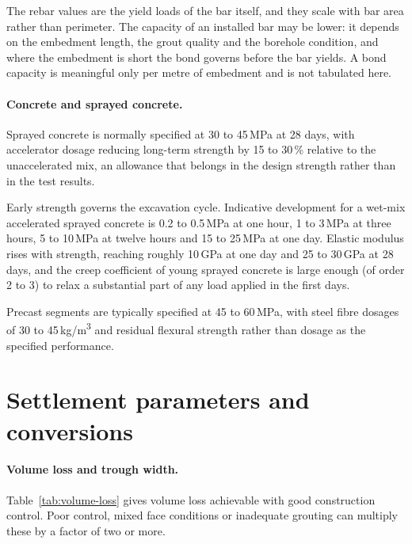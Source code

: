The rebar values are the yield loads of the bar itself, and they scale with bar
area rather than perimeter. The capacity of an installed bar may be lower: it
depends on the embedment length, the grout quality and the borehole condition,
and where the embedment is short the bond governs before the bar yields. A
bond capacity is meaningful only per metre of embedment and is not tabulated
here.

\paragraph{Concrete and sprayed concrete.}
Sprayed concrete is normally specified at 30 to 45\,MPa at 28 days, with
accelerator dosage reducing long-term strength by 15 to 30\,\% relative to the
unaccelerated mix, an allowance that belongs in the design strength rather
than in the test results.

Early strength governs the excavation cycle. Indicative development for a
wet-mix accelerated sprayed concrete is 0.2 to 0.5\,MPa at one hour, 1 to 3\,MPa at
three hours, 5 to 10\,MPa at twelve hours and 15 to 25\,MPa at one day. Elastic
modulus rises with strength, reaching roughly 10\,GPa at one day and 25 to
30\,GPa at 28 days, and the creep coefficient of young sprayed concrete is large
enough (of order 2 to 3) to relax a substantial part of any load applied
in the first days.

Precast segments are typically specified at 45 to 60\,MPa, with steel fibre
dosages of 30 to 45\,kg/m\textsuperscript{3} and residual flexural strength
rather than dosage as the specified performance.

\section{Settlement parameters and conversions}
\label{sec:settlement-parameters-and-conversions}

\paragraph{Volume loss and trough width.}
Table~\ref{tab:volume-loss} gives volume loss achievable with good
construction control. Poor control, mixed face conditions or inadequate
grouting can multiply these by a factor of two or more.

